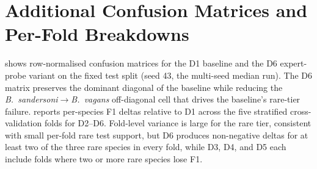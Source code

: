 \documentclass[runningheads]{llncs}
\begin{document}
\begin{table}[t]
  \caption{Additive single-species ablation. Each variant adds $+200$
  unfiltered synthetics for exactly one rare species to the D1
  real-only baseline. $\Delta$ values are signed differences from D1.}
  \label{tab:suppl-additive}
  \centering
\end{table}

\section{Additional Confusion Matrices and Per-Fold Breakdowns}
\label{sec:suppl-confusion}

 shows row-normalised confusion matrices for
the D1 baseline and the D6 expert-probe variant on the fixed test split
(seed 43, the multi-seed median run). The D6 matrix preserves the
dominant diagonal of the baseline while reducing the
\emph{B.~sandersoni}$\to$\emph{B.~vagans} off-diagonal cell that drives
the baseline's rare-tier failure.  reports
per-species F1 deltas relative to D1 across the five stratified
cross-validation folds for D2--D6. Fold-level variance is large for the
rare tier, consistent with small per-fold rare test support, but D6
produces non-negative deltas for at least two of the three rare species
in every fold, while D3, D4, and D5 each include folds where two or
more rare species lose F1.
\end{document}
